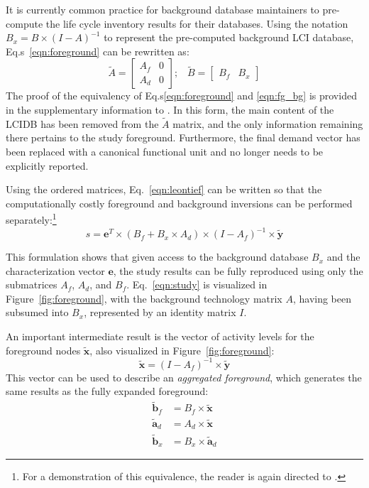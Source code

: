 It is currently common practice for background database maintainers to pre-compute the life cycle inventory results for their databases.  Using the notation $B_x = B \times (I - A)^{-1}$ to represent the pre-computed background LCI database, Eq.s~\ref{eqn:foreground} can be rewritten as:
\begin{equation}
 \tilde{A} = \left[\begin{array}{cc} 
A_f &  0 \\
A_d & 0 
   \end{array}\right];\;\;\;  \tilde{B} = \left[\begin{array}{cc} B_f & B_x \end{array}\right ]
\label{eqn:fg_bg}
\end{equation}
The proof of the equivalency of Eq.s\ref{eqn:foreground} and \ref{eqn:fg_bg} is provided in the supplementary information to \cite{Kuczenski_JLCA_2015}.  In this form, the main content of the LCIDB has been removed from the $\tilde{A}$ matrix, and the only information remaining there pertains to the study foreground.  Furthermore, the final demand vector has been replaced with a canonical functional unit and no longer needs to be explicitly reported.

Using the ordered matrices, Eq.~\ref{eqn:leontief} can be written so that the computationally costly foreground and background inversions can be performed separately:\footnote{For a demonstration of this equivalence, the reader is again directed to \cite{Kuczenski_JLCA_2015}.}
\begin{equation}
s = \mathbf{e}^T \times (B_f + B_x\times A_d) \times (I - A_f)^{-1} \times \tilde{\mathbf{y}}
\label{eqn:study}
\end{equation}

This formulation shows that given access to the background database $B_x$ and the characterization vector $\mathbf{e}$, the study results can be fully reproduced using only the submatrices $A_f$, $A_d$, and $B_f$.  Eq.~\ref{eqn:study} is visualized in Figure~\ref{fig:foreground}, with the background technology matrix $A$, having been subsumed into $B_x$, represented by an identity matrix $I$.  

An important intermediate result is the vector of activity levels for the foreground nodes $\tilde{\mathbf{x}}$, also visualized in Figure~\ref{fig:foreground}:
\begin{equation}
\tilde{\mathbf{x}} = (I - A_f)^{-1} \times \tilde{\mathbf{y}}
\label{eqn:inv}
\end{equation}
This vector can be used to describe an \emph{aggregated foreground}, which generates the same results as the fully expanded foreground:
\begin{equation}
\begin{array}{rl}
    \tilde{\mathbf{b}}_f & = B_f \times \tilde{\mathbf{x}} \\
    \tilde{\mathbf{a}}_d & = A_d \times \tilde{\mathbf{x}} \\
    \tilde{\mathbf{b}}_x & = B_x \times \tilde{\mathbf{a}}_d
\end{array}
\label{eqn:agg}
\end{equation}

